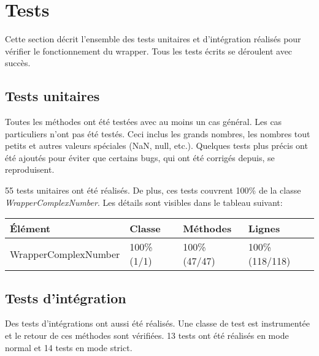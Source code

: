\section{Tests}

Cette section décrit l'ensemble des tests unitaires et d'intégration réalisés pour vérifier le fonctionnement du wrapper. Tous les tests écrits se déroulent avec succès.

\subsection{Tests unitaires}

Toutes les méthodes ont été testées avec au moins un cas général. Les cas particuliers n'ont pas été testés. Ceci inclus les grands nombres, les nombres tout petits et autres valeurs spéciales (NaN, null, etc.). Quelques tests plus précis ont été ajoutés pour éviter que certains bugs, qui ont été corrigés depuis, se reproduisent.

55 tests unitaires ont été réalisés. De plus, ces tests couvrent 100\% de la classe \textit{WrapperComplexNumber}. Les détails sont visibles dans le tableau suivant:

\begin{table}[h]
    \begin{tabularx}{\columnwidth}{ | p{12em} | X | X | X |}
        \hline
        \textbf{Élément} & \textbf{Classe} & \textbf{Méthodes} & \textbf{Lignes} \\
        \hline
        WrapperComplexNumber & 100\% (1/1) & 100\% (47/47) & 100\% (118/118) \\
        \hline
    \end{tabularx}
\end{table}

\subsection{Tests d'intégration}

Des tests d'intégrations ont aussi été réalisés. Une classe de test est instrumentée et le retour de ces méthodes sont vérifiées. 13 tests ont été réalisés en mode normal et 14 tests en mode strict.
